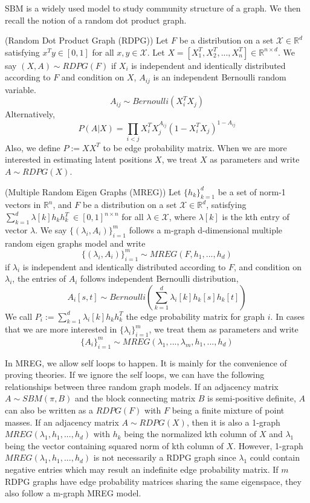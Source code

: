 \documentclass[10pt,journal,compsoc]{IEEEtran}
\newenvironment{definition}[1][Definition]{\begin{trivlist}
		\item[\hskip \labelsep {\bfseries #1}]}{\end{trivlist}}
\begin{document}
\noindent SBM is a widely used model to study community structure of a graph\cite{karrer2011stochastic}. We then recall the notion of a random dot product graph\cite{young2007random}. 

\begin{definition} (Random Dot Product Graph (RDPG)) Let $F$ be a distribution on a set $\mathcal{X} \in \mathbb{R}^d$ satisfying $x^T y \in [0, 1]$ for all $x, y \in \mathcal{X}$. Let $X=[X_1^T,X_2^T,...,X_n^T] \in \mathbb{R}^{n \times d}$. We say $(X,A) \sim RDPG(F)$ if $X_i$ is independent and identically distributed according to $F$ and condition on $X$, $A_{ij}$ is an independent Bernoulli random variable.
\[ A_{ij} \sim Bernoulli(X_i^T X_j) \]
Alternatively,
\[ P(A|X) = \prod_{i<j} X_i^T X_j ^{ A_{ij}} (1-X_i^T X_j)^{1- A_{ij}}\]
Also, we define $P:=XX^T$ to be edge probability matrix. When we are more interested in estimating latent positions $X$, we treat $X$ as parameters and write $A \sim RDPG(X)$.
\end{definition}

\begin{definition} (Multiple Random Eigen Graphs (MREG)) Let $\{h_k\}_{k=1}^{d}$ be a set of norm-1 vectors in $\mathbb{R}^{n}$, and  $F$ be a distribution on a set $\mathcal{X} \in \mathbb{R}^d$,  satisfying $\sum\limits_{k=1}^{d} \lambda [k] h_k  h_k^T \  \in [0, 1]^{n \times n} $ for all $\lambda \in \mathcal{X}$, where $\lambda[k]$ is the kth entry of vector $\lambda$. We say $\{(\lambda_i,A_i)\}_{i=1}^{m}$ follows a m-graph d-dimensional multiple random eigen graphs model and write
\[\{(\lambda_i,A_i)\}_{i=1}^{m} \sim MREG(F,h_1,...,h_d)\]
if $\lambda_i$ is independent and identically distributed according to $F$, and condition on $\lambda_i$, the entries of $A_i$ follows independent Bernoulli distribution,
\[ A_{i}[s,t] \sim Bernoulli( \sum_{k=1}^{d} \lambda_{i}[k] h_{k} [s] h_{k} [t] ) \]
We call $P_i:=\sum_{k=1}^{d} \lambda_i [k] h_k  h_k^T$ the edge probability matrix for graph $i$. In cases that we are more interested in $\{\lambda_i\}_{i=1}^m$, we treat them as parameters and write 
\[\{A_i\}_{i=1}^{m} \sim MREG(\lambda_1,...,\lambda_m,h_1,...,h_d)\] 
\end{definition}


\noindent In MREG, we allow self loops to happen. It is mainly for the convenience of proving theories. If we ignore the self loops, we can have the following relationships between three random graph models. If an adjacency matrix $A \sim SBM(\pi,B)$ and the block connecting matrix $B$ is semi-positive definite, $A$ can also be written as a $RDPG(F)$ with $F$ being a finite mixture of point masses. If an adjacency matrix $A \sim RDPG(X)$, then it is also a 1-graph $MREG(\lambda_1,h_1,...,h_d)$ with $h_k$ being the normalized kth column of $X$ and $\lambda_1$ being the vector containing squared norm of kth column of $X$. However, 1-graph $MREG(\lambda_1,h_1,...,h_d)$ is not necessarily a RDPG graph since $\lambda_1$ could contain negative entries which may result an indefinite edge probability matrix. If $m$ RDPG graphs have edge probability matrices sharing the same eigenspace, they also follow a m-graph MREG model. 
\end{document}
